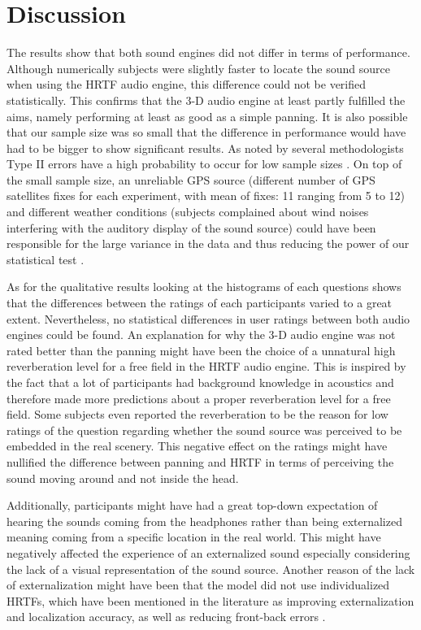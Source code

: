 \documentclass[journal]{IEEEtran}
\begin{document}
\section{Discussion}
The results show that both sound engines did not differ in terms of performance. Although numerically subjects were slightly faster to locate the sound source when using the HRTF audio engine, this difference could not be verified statistically. This confirms that the 3-D audio engine at least partly fulfilled the aims, namely performing at least as good as a simple panning. It is also possible that our sample size was so small that the difference in performance would have had to be bigger to show significant results. As noted by several methodologists Type II errors have a high probability to occur for low sample sizes \cite{DeWinter2013}. On top of the small sample size, an unreliable GPS source (different number of GPS satellites fixes for each experiment, with mean of fixes: 11 ranging from 5 to 12) and different weather conditions (subjects complained about wind noises interfering with the auditory display of the sound source) could have been responsible for the large variance in the data and thus reducing the power of our statistical test \cite{McClelland2000}.

As for the qualitative results looking at the histograms of each questions shows that the differences between the ratings of each participants varied to a great extent. Nevertheless, no statistical differences in user ratings between both audio engines could be found. An explanation for why the 3-D audio engine was not rated better than the panning might have been the choice of a unnatural high reverberation level for a free field in the HRTF audio engine. This is inspired by the fact that a lot of participants had background knowledge in acoustics and therefore made more predictions about a proper reverberation level for a free field. Some subjects even reported the reverberation to be the reason for low ratings of the question regarding whether the sound source was perceived to be embedded in the real scenery. This negative effect on the ratings might have nullified the difference between panning and HRTF in terms of perceiving the sound moving around and not inside the head.

Additionally, participants might have had a great top-down expectation of hearing the sounds coming from the headphones rather than being externalized meaning coming from a specific location in the real world. This might have negatively affected the experience of an externalized sound especially considering the lack of a visual representation of the sound source. Another reason of the lack of externalization might have been that the model did not use individualized HRTFs, which have been mentioned in the literature as improving externalization and localization accuracy, as well as reducing front-back errors \cite{begault2000direct, frederic1997}. 
\end{document}
